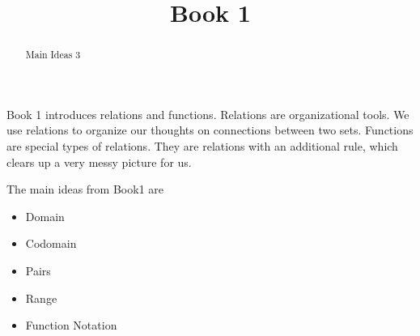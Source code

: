 \documentclass{ximera}
\title{Book 1}
\begin{document}
\begin{abstract}
Main Ideas 3
\end{abstract}

\maketitle

\begin{sectionOutcomes}

Book 1 introduces relations and functions. Relations are organizational tools.  We use relations to organize our thoughts on connections between two sets. Functions are special types of relations.  They are relations with an additional rule, which clears up a very messy picture for us. 

The main ideas from Book1 are

\begin{itemize}
\item Domain 
\item Codomain
\item Pairs
\item Range
\item Function Notation
\end{itemize}

\end{sectionOutcomes}
\end{document}
